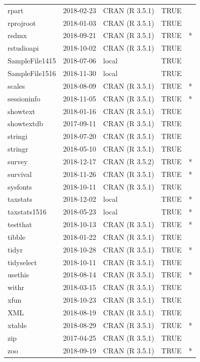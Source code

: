 \documentclass{grattan}\usepackage[]{graphicx}\usepackage[]{color}
\begin{document}
\begin{longtable}{lllll}
  rpart & 2018-02-23 & CRAN (R 3.5.1) & TRUE &  \\ 
  rprojroot & 2018-01-03 & CRAN (R 3.5.1) & TRUE &  \\ 
  rsdmx & 2018-09-21 & CRAN (R 3.5.1) & TRUE & * \\ 
  rstudioapi & 2018-10-02 & CRAN (R 3.5.1) & TRUE &  \\ 
  SampleFile1415 & 2018-07-06 & local & TRUE &  \\ 
  SampleFile1516 & 2018-11-30 & local & TRUE &  \\ 
  scales & 2018-08-09 & CRAN (R 3.5.1) & TRUE & * \\ 
  sessioninfo & 2018-11-05 & CRAN (R 3.5.1) & TRUE & * \\ 
  showtext & 2018-01-16 & CRAN (R 3.5.1) & TRUE &  \\ 
  showtextdb & 2017-09-11 & CRAN (R 3.5.1) & TRUE &  \\ 
  stringi & 2018-07-20 & CRAN (R 3.5.1) & TRUE &  \\ 
  stringr & 2018-05-10 & CRAN (R 3.5.1) & TRUE &  \\ 
  survey & 2018-12-17 & CRAN (R 3.5.2) & TRUE & * \\ 
  survival & 2018-11-26 & CRAN (R 3.5.1) & TRUE & * \\ 
  sysfonts & 2018-10-11 & CRAN (R 3.5.1) & TRUE &  \\ 
  taxstats & 2018-12-02 & local & TRUE & * \\ 
  taxstats1516 & 2018-05-23 & local & TRUE & * \\ 
  testthat & 2018-10-13 & CRAN (R 3.5.1) & TRUE & * \\ 
  tibble & 2018-01-22 & CRAN (R 3.5.1) & TRUE &  \\ 
  tidyr & 2018-10-28 & CRAN (R 3.5.1) & TRUE & * \\ 
  tidyselect & 2018-10-11 & CRAN (R 3.5.1) & TRUE &  \\ 
  usethis & 2018-08-14 & CRAN (R 3.5.1) & TRUE & * \\ 
  withr & 2018-03-15 & CRAN (R 3.5.1) & TRUE &  \\ 
  xfun & 2018-10-23 & CRAN (R 3.5.1) & TRUE &  \\ 
  XML & 2018-08-19 & CRAN (R 3.5.1) & TRUE &  \\ 
  xtable & 2018-08-29 & CRAN (R 3.5.1) & TRUE & * \\ 
  zip & 2017-04-25 & CRAN (R 3.5.1) & TRUE &  \\ 
  zoo & 2018-09-19 & CRAN (R 3.5.1) & TRUE & * \\ 
   \bottomrule
\end{longtable}
\end{document}
